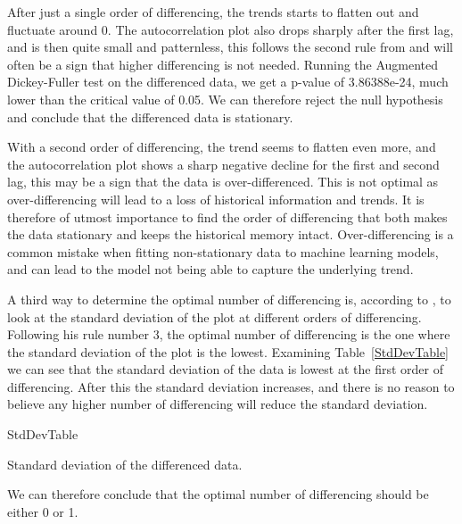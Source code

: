 After just a single order of differencing, the trends starts to flatten out and fluctuate around 0. The autocorrelation plot also drops sharply after the first lag, and is then quite small and patternless, this follows the second rule from \textcite{nau_2019} and will often be a sign that higher differencing is not needed. Running the Augmented Dickey-Fuller test on the differenced data, we get a p-value of 3.86388e-24, much lower than the critical value of 0.05. We can therefore reject the null hypothesis and conclude that the differenced data is stationary. 

With a second order of differencing, the trend seems to flatten even more, and the autocorrelation plot shows a sharp negative decline for the first and second lag, this may be a sign that the data is over-differenced. This is not optimal as over-differencing will lead to a loss of historical information and trends. It is therefore of utmost importance to find the order of differencing that both makes the data stationary and keeps the historical memory intact. Over-differencing is a common mistake when fitting non-stationary data to machine learning models, and can lead to the model not being able to capture the underlying trend.~\parencite{lopezde_prado2018}

A third way to determine the optimal number of differencing is, according to \textcite{nau_2019}, to look at the standard deviation of the plot at different orders of differencing. Following his rule number 3, the optimal number of differencing is the one where the standard deviation of the plot is the lowest. Examining Table~\ref{StdDevTable} we can see that the standard deviation of the data is lowest at the first order of differencing. After this the standard deviation increases, and there is no reason to believe any higher number of differencing will reduce the standard deviation. 

\begin{table}[H]
    \begin{center}
        {StdDevTable}
        \caption{\label{StdDevTable}Standard deviation of the differenced data.}
    \end{center}
\end{table}

We can therefore conclude that the optimal number of differencing should be either 0 or 1.

